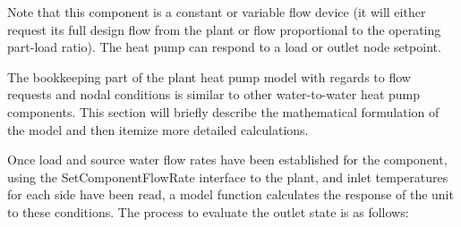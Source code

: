 Note that this component is a constant or variable flow device (it will either request its full design flow from the plant or flow proportional to the operating part-load ratio). The heat pump can respond to a load or outlet node setpoint.

The bookkeeping part of the plant heat pump model with regards to flow requests and nodal conditions is similar to other water-to-water heat pump components. This section will briefly describe the mathematical formulation of the model and then itemize more detailed calculations.

Once load and source water flow rates have been established for the component, using the SetComponentFlowRate interface to the plant, and inlet temperatures for each side have been read, a model function calculates the response of the unit to these conditions. The process to evaluate the outlet state is as follows:

